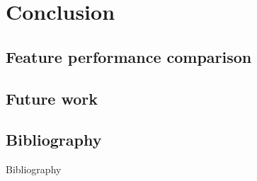 \documentclass{beamer}
\begin{document}
\section{Conclusion}

	\subsection{Feature performance comparison}

	\subsection{Future work}

	\subsection{Bibliography}

	\begin{frame}{Bibliography}
		
		
	\end{frame}
\end{document}
